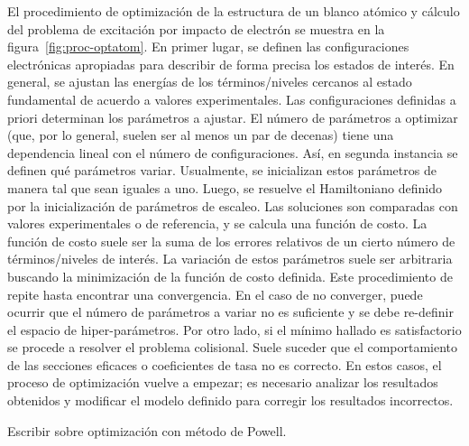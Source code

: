 El procedimiento de optimización de la estructura de un blanco atómico
y cálculo del problema de excitación por impacto de electrón se muestra 
en la figura~\ref{fig:proc-optatom}. En primer lugar, se definen las 
configuraciones electrónicas apropiadas para describir de forma precisa 
los estados de interés. En general, se ajustan las energías de los 
términos/niveles cercanos al estado fundamental de acuerdo a valores 
experimentales. Las configuraciones definidas a priori determinan los 
parámetros a ajustar. El número de parámetros a optimizar (que, por lo 
general, suelen ser al menos un par de decenas) tiene una dependencia 
lineal con el número de configuraciones. Así, en segunda instancia se 
definen qué parámetros variar. Usualmente, se inicializan estos 
parámetros de manera tal que sean iguales a uno. Luego, se resuelve el
Hamiltoniano definido por la inicialización de parámetros de escaleo. Las
soluciones son comparadas con valores experimentales o de referencia, y 
se calcula una función de costo. La función de costo suele ser la suma de
los errores relativos de un cierto número de términos/niveles de interés. 
La variación de estos parámetros suele ser arbitraria buscando la 
minimización de la función de costo definida. Este procedimiento de 
repite hasta encontrar una convergencia. En el caso de no converger, 
puede ocurrir que el número de parámetros a variar no es suficiente y se 
debe re-definir el espacio de hiper-parámetros. Por otro lado, si el 
mínimo hallado es satisfactorio se procede a resolver el problema 
colisional. Suele suceder que el comportamiento de las secciones eficaces 
o coeficientes de tasa no es correcto. En estos casos, el proceso de 
optimización vuelve a empezar; es necesario analizar los resultados 
obtenidos y modificar el modelo definido para corregir los resultados 
incorrectos. 

{\color{red} Escribir sobre optimización con método de Powell.}

